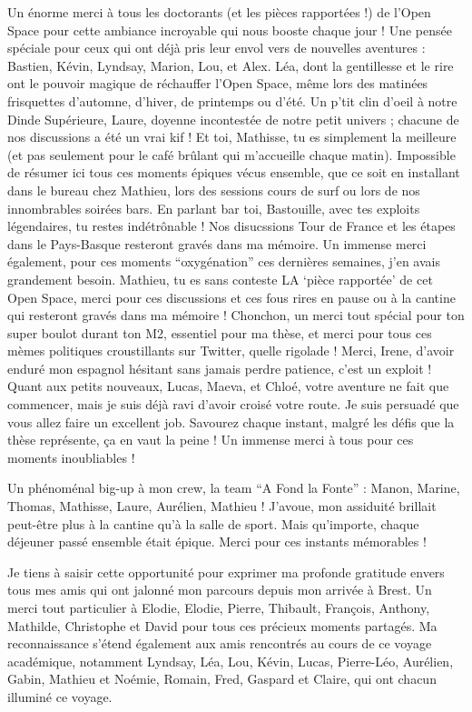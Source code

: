 \begin{refsection}
Un énorme merci à tous les doctorants (et les pièces rapportées !) de
l'Open Space pour cette ambiance incroyable qui nous booste chaque jour
! Une pensée spéciale pour ceux qui ont déjà pris leur envol vers de
nouvelles aventures : Bastien, Kévin, Lyndsay, Marion, Lou, et Alex.
Léa, dont la gentillesse et le rire ont le pouvoir magique de réchauffer
l'Open Space, même lors des matinées frisquettes d'automne, d'hiver, de
printemps ou d'été. Un p'tit clin d'oeil à notre Dinde Supérieure,
Laure, doyenne incontestée de notre petit univers ; chacune de nos
discussions a été un vrai kif ! Et toi, Mathisse, tu es simplement la
meilleure (et pas seulement pour le café brûlant qui m'accueille chaque
matin). Impossible de résumer ici tous ces moments épiques vécus
ensemble, que ce soit en installant dans le bureau chez Mathieu, lors
des sessions cours de surf ou lors de nos innombrables soirées bars. En
parlant bar toi, Bastouille, avec tes exploits légendaires, tu restes
indétrônable ! Nos disucssions Tour de France et les étapes dans le
Pays-Basque resteront gravés dans ma mémoire. Un immense merci
également, pour ces moments ``oxygénation'' ces dernières semaines, j'en
avais grandement besoin. Mathieu, tu es sans conteste LA `pièce
rapportée' de cet Open Space, merci pour ces discussions et ces fous
rires en pause ou à la cantine qui resteront gravés dans ma mémoire !
Chonchon, un merci tout spécial pour ton super boulot durant ton M2,
essentiel pour ma thèse, et merci pour tous ces mèmes politiques
croustillants sur Twitter, quelle rigolade ! Merci, Irene, d'avoir
enduré mon espagnol hésitant sans jamais perdre patience, c'est un
exploit ! Quant aux petits nouveaux, Lucas, Maeva, et Chloé, votre
aventure ne fait que commencer, mais je suis déjà ravi d'avoir croisé
votre route. Je suis persuadé que vous allez faire un excellent job.
Savourez chaque instant, malgré les défis que la thèse représente, ça en
vaut la peine ! Un immense merci à tous pour ces moments inoubliables !

Un phénoménal big-up à mon crew, la team ``A Fond la Fonte'' : Manon,
Marine, Thomas, Mathisse, Laure, Aurélien, Mathieu ! J'avoue, mon
assiduité brillait peut-être plus à la cantine qu'à la salle de sport.
Mais qu'importe, chaque déjeuner passé ensemble était épique. Merci pour
ces instants mémorables !

Je tiens à saisir cette opportunité pour exprimer ma profonde gratitude
envers tous mes amis qui ont jalonné mon parcours depuis mon arrivée à
Brest. Un merci tout particulier à Elodie, Elodie, Pierre, Thibault,
François, Anthony, Mathilde, Christophe et David pour tous ces précieux
moments partagés. Ma reconnaissance s'étend également aux amis
rencontrés au cours de ce voyage académique, notamment Lyndsay, Léa,
Lou, Kévin, Lucas, Pierre-Léo, Aurélien, Gabin, Mathieu et Noémie,
Romain, Fred, Gaspard et Claire, qui ont chacun illuminé ce voyage.


\end{refsection}

